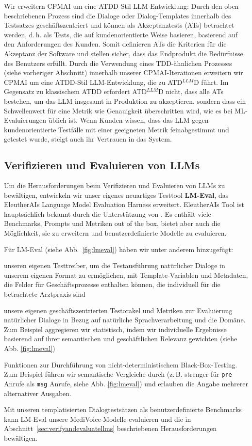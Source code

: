 \documentclass[twocolumn]{article}
\newcommand{\ATDLLMD}{ATD$^{LLM}$D}%
\begin{document}
Wir erweitern CPMAI um eine ATDD-Stil LLM-Entwicklung: Durch den oben beschriebenen Prozess sind die Dialoge oder Dialog-Templates innerhalb des Testsatzes geschäftszentriert und können als Akzeptanztests (ATs) betrachtet werden, d.\,h. als Tests, die auf kundenorientierte Weise basieren, basierend auf den Anforderungen des Kunden. Somit definieren ATs die Kriterien für die Akzeptanz der Software und stellen sicher, dass das Endprodukt die Bedürfnisse des Benutzers erfüllt. Durch die Verwendung eines TDD-ähnlichen Prozesses (siehe vorheriger Abschnitt) innerhalb unserer CPMAI-Iterationen erweitern wir CPMAI um eine ATDD-Stil LLM-Entwicklung, die zu \ATDLLMD{} führt. Im Gegensatz zu klassischem ATDD erfordert \ATDLLMD{} nicht, dass alle ATs bestehen, um das LLM insgesamt in Produktion zu akzeptieren, sondern dass ein Schwellenwert für eine Metrik wie Genauigkeit überschritten wird, wie es bei ML-Evaluierungen üblich ist. Wenn Kunden wissen, dass das LLM gegen kundenorientierte Testfälle mit einer geeigneten Metrik feinabgestimmt und getestet wurde, steigt auch ihr Vertrauen in das System.

\subsection{Verifizieren und Evaluieren von LLMs}

Um die Herausforderungen beim Verifizieren und Evaluieren von LLMs zu bewältigen, entwickeln wir unser eigenes neuartiges Testtool \textbf{LM-Eval}, das EleutherAIs Language Model Evaluation Harness \cite{Gao23} erweitert. EleutherAIs Tool ist hauptsächlich bekannt durch die Unterstützung von \cite{HF24}. Es enthält viele Benchmarks, Prompts und Metriken out of the box, bietet aber auch die Möglichkeit, sie zu erweitern und benutzerdefinierte Modelle zu evaluieren.

Für LM-Eval (siehe Abb.~\ref{fig:lmeval}) haben wir unter anderem hinzugefügt:
\begin{compactitem}
\item unseren eigenen Testtreiber, um die Testausführung natürlicher Dialoge in unserem eigenen Format zu ermöglichen, mit Template-Variablen und Metadaten, die Felder für Geschäftsprozesse enthalten können, die individuell für die betrachtete Arztpraxis sind
\item unsere eigenen geschäftszentrierten Testorakel und Metriken zur Evaluierung natürlicher Dialoge in Bezug auf natürliche Sprachverarbeitung und die Domäne. Zum Beispiel aggregieren wir statistisch, indem wir individuelle Ergebnisse basierend auf ihrer semantischen und geschäftlichen Relevanz gewichten (siehe Abb. \ref{fig:lmeval})
\item Funktionen zur Durchführung von nicht-deterministischem Black-Box-Testing. Zum Beispiel führen wir semantische Vergleiche durch (z.\,B. strenger für \texttt{pre} Anrufe als \texttt{msg} Anrufe, siehe Abb. \ref{fig:lmeval}) und erlauben die Angabe mehrerer alternativer Ausgaben.
\end{compactitem}
Mit unseren templatisierten Dialogtestsätzen als benutzerdefinierte Benchmarks kann LM-Eval unsere MediVoice-Modelle evaluieren und die in Abschnitt~\ref{sec:verifyandevaluatellms} beschriebenen Herausforderungen bewältigen.
\end{document}
